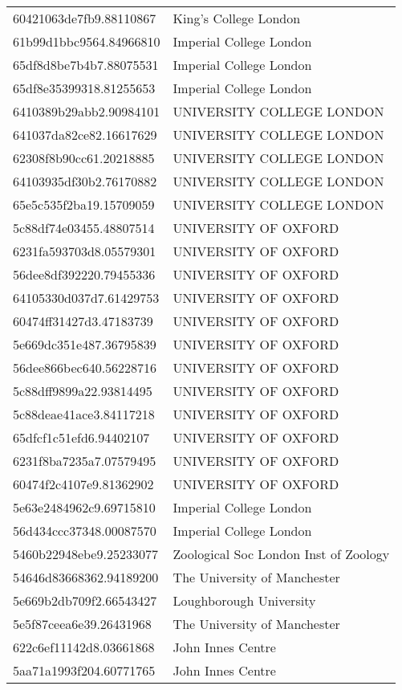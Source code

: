 \begin{tabular}{ll}
60421063de7fb9.88110867 & King's College London \\
61b99d1bbc9564.84966810 & Imperial College London \\
65df8d8be7b4b7.88075531 & Imperial College London \\
65df8e35399318.81255653 & Imperial College London \\
6410389b29abb2.90984101 & UNIVERSITY COLLEGE LONDON \\
641037da82ce82.16617629 & UNIVERSITY COLLEGE LONDON \\
62308f8b90cc61.20218885 & UNIVERSITY COLLEGE LONDON \\
64103935df30b2.76170882 & UNIVERSITY COLLEGE LONDON \\
65e5c535f2ba19.15709059 & UNIVERSITY COLLEGE LONDON \\
5c88df74e03455.48807514 & UNIVERSITY OF OXFORD \\
6231fa593703d8.05579301 & UNIVERSITY OF OXFORD \\
56dee8df392220.79455336 & UNIVERSITY OF OXFORD \\
64105330d037d7.61429753 & UNIVERSITY OF OXFORD \\
60474ff31427d3.47183739 & UNIVERSITY OF OXFORD \\
5e669dc351e487.36795839 & UNIVERSITY OF OXFORD \\
56dee866bec640.56228716 & UNIVERSITY OF OXFORD \\
5c88dff9899a22.93814495 & UNIVERSITY OF OXFORD \\
5c88deae41ace3.84117218 & UNIVERSITY OF OXFORD \\
65dfcf1c51efd6.94402107 & UNIVERSITY OF OXFORD \\
6231f8ba7235a7.07579495 & UNIVERSITY OF OXFORD \\
60474f2c4107e9.81362902 & UNIVERSITY OF OXFORD \\
5e63e2484962c9.69715810 & Imperial College London \\
56d434ccc37348.00087570 & Imperial College London \\
5460b22948ebe9.25233077 & Zoological Soc London Inst of Zoology \\
54646d83668362.94189200 & The University of Manchester \\
5e669b2db709f2.66543427 & Loughborough University \\
5e5f87ceea6e39.26431968 & The University of Manchester \\
622c6ef11142d8.03661868 & John Innes Centre \\
5aa71a1993f204.60771765 & John Innes Centre \\

\end{tabular}

